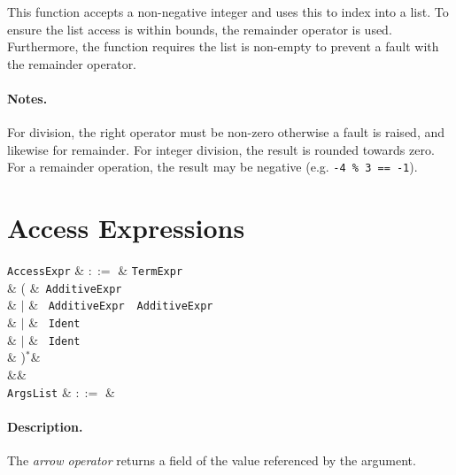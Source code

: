 

This function accepts a non-negative integer and uses this to index into a list.  To ensure the list access is within bounds, the remainder operator is used.  Furthermore, the function requires the list is non-empty to prevent a fault with the remainder operator.

\paragraph{Notes.}  For division, the right operator must be non-zero otherwise a \gls{fault} is raised, and likewise for remainder.  For integer division, the result is rounded towards zero.  For a remainder operation, the result may be negative (e.g. \lstinline{-4 % 3 == -1}).


\section{Access Expressions}
\label{c_expr_access}

\begin{syntax}
  \verb+AccessExpr+ & $::=$ & \verb+TermExpr+\\
   &  \big( &\token{[}\ \verb+AdditiveExpr+\ \token{]}\\
   & $|$ & \token{[}\ \verb+AdditiveExpr+\ \ \verb+AdditiveExpr+\ \token{]}\\
   & $|$ & \ \verb+Ident+\ \\
   & $|$ & \token{->}\ \verb+Ident+\ \\
   & \big)$^*$&\\
&&\\
\verb+ArgsList+ & $::=$ & \\
\end{syntax}

\paragraph{Description.}

The {\em arrow operator} returns a field of the value referenced by the argument.


